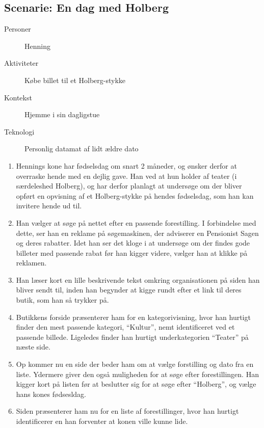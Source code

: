 \subsection{Scenarie: En dag med Holberg}

\begin{description}
    \item[Personer] Henning
    \item[Aktiviteter] Købe billet til et Holberg-stykke
    \item[Kontekst] Hjemme i sin dagligstue
    \item[Teknologi] Personlig datamat af lidt ældre dato
\end{description}

\begin{enumerate}
    \item {
        Hennings kone har fødselsdag om snart 2 måneder, og ønsker derfor at overraske hende med en dejlig gave. Han ved at hun holder af teater (i særdeleshed Holberg), og har derfor planlagt at undersøge om der bliver opført en opvisning af et Holberg-stykke på hendes fødselsdag, som han kan invitere hende ud til.
    }
    \item {
        Han vælger at søge på nettet efter en passende forestilling. I forbindelse med dette, ser han en reklame på søgemaskinen, der adviserer en Pensionist Sagen og deres rabatter. Idet han ser det kloge i at undersøge om der findes gode billeter med passende rabat før han kigger videre, vælger han at klikke på reklamen. 
    }
    \item {
        Han læser kort en lille beskrivende tekst omkring organisationen på siden han bliver sendt til, inden han begynder at kigge rundt efter et link til deres butik, som han så trykker på.
    }
    \item {
        Butikkens forside præsenterer ham for en kategorivisning, hvor han hurtigt finder den mest passende kategori, ``Kultur'', nemt identificeret ved et passende billede. Ligeledes finder han hurtigt underkategorien ``Teater'' på næste side.
    }
    \item {
        Op kommer nu en side der beder ham om at vælge forstilling og dato fra en liste. Ydermere giver den også muligheden for at søge efter forestillingen. Han kigger kort på listen før at beslutter sig for at søge efter ``Holberg'', og vælge hans kones fødsesldag.
    }
    \item {
        Siden præsenterer ham nu for en liste af forestillinger, hvor han hurtigt identificerer en han forventer at konen ville kunne lide.
}
\end{enumerate}
